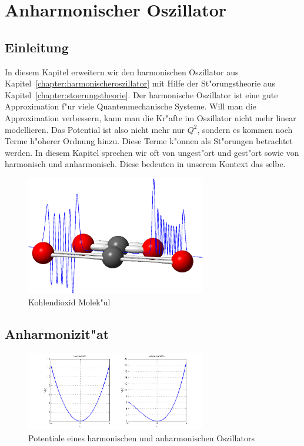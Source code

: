 \chapter{Anharmonischer Oszillator\label{chapter:anharmonisch}}
\begin{refsection}

\newpage
\section{Einleitung}
In diesem Kapitel erweitern wir den harmonischen Oszillator aus Kapitel~\ref{chapter:harmonischeroszillator} mit Hilfe der St"orungstheorie aus Kapitel~\ref{chapter:stoerungstheorie}. Der harmonische Oszillator ist eine gute Approximation f"ur viele Quantenmechanische Systeme. Will man die Approximation verbessern, kann man die Kr"afte im Oszillator nicht mehr linear modellieren. Das Potential ist also nicht mehr nur $Q^2$, sondern es kommen noch Terme h"oherer Ordnung hinzu. Diese Terme k"onnen als St"orungen betrachtet werden. In diesem Kapitel sprechen wir oft von ungest"ort und gest"ort sowie von harmonisch und anharmonisch. Diese bedeuten in unserem Kontext das selbe.

\begin{figure}[h]	%
\centering
\includegraphics[width=0.7\textwidth]{anharmonisch/images/Titelbild.png}
\caption{Kohlendioxid Molek"ul
\label{skript:Titelbild}}
\end{figure}

\section{Anharmonizit"at}

\begin{figure}[h]	%
\centering
\includegraphics[width=0.7\textwidth]{anharmonisch/images/Potential.png}
\caption{Potentiale eines harmonischen und anharmonischen Oszillators
\label{skript:Potentiale}}
\end{figure}


\end{refsection}
